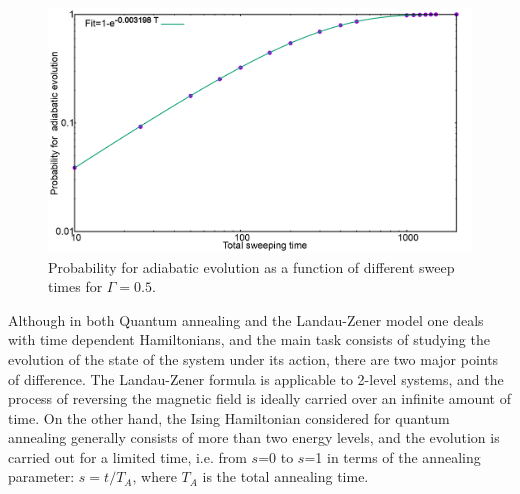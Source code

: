 \documentclass[../main.tex]{subfiles}
\begin{document}
\begin{figure}[H]
\centering 
\includegraphics[scale=0.24]{Prob_1spin_H100.png}
\caption{Probability for adiabatic evolution as a function of different sweep times for $\Gamma=0.5$.}
\label{fig:lz3}
\end{figure}


Although in both Quantum annealing and the Landau-Zener model one deals with time dependent Hamiltonians, and the main task consists of studying the evolution of the state of the system under its action, there are two major points of difference. The Landau-Zener formula is applicable to 2-level systems, and the process of reversing the magnetic field is ideally carried over an infinite amount of time. On the other hand, the Ising Hamiltonian considered for quantum annealing generally consists of more than two energy levels, and the evolution is carried out for a limited time, i.e. from $s$=0 to $s$=1 in terms of the annealing parameter: $s=t/T_A$, where $T_A$ is the total annealing time.
\end{document}
